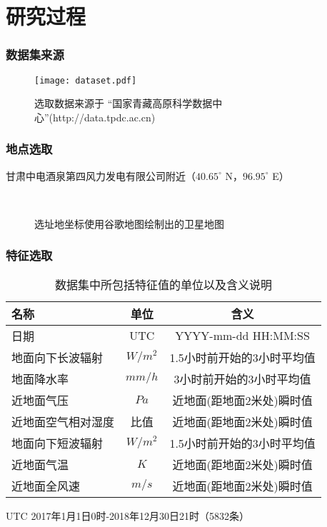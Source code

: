 \documentclass[14pt, AutoFakeBold]{ppt}
\begin{document}
\section{研究过程}

\begin{frame}
  \frametitle{数据集来源}
  \begin{figure}[H]
    \centering
    \texttt{[image: dataset.pdf]}
    \caption{选取数据来源于
    “国家青藏高原科学数据中心”(http://data.tpdc.ac.cn)}
    \label{fig_dataset}
\end{figure}
\end{frame}

\begin{frame}
  \frametitle{地点选取}
  甘肃中电酒泉第四风力发电有限公司附近（$40.65^{\circ}$ N，$96.95^{\circ}$ E）
  \begin{figure}[H]
    \centering
    \\
    \caption{选址地坐标使用谷歌地图绘制出的卫星地图}
    \label{fig_google_maps}
\end{figure}
\end{frame}

\begin{frame}
  \frametitle{特征选取}
  \begin{table}[H]
    \centering
    \caption{数据集中所包括特征值的单位以及含义说明}
    \begin{tabular}{lcc}
    \toprule
    名称 & 单位 & 含义 \\
    \midrule
    日期 & UTC & YYYY-mm-dd HH:MM:SS \\
    地面向下长波辐射 & $W/m^2$ & 1.5小时前开始的3小时平均值 \\
    地面降水率 & $mm/h$ & 3小时前开始的3小时平均值 \\
    近地面气压 & $Pa$ & 近地面(距地面2米处)瞬时值 \\
    近地面空气相对湿度 & 比值 & 近地面(距地面2米处)瞬时值 \\
    地面向下短波辐射 & $W/m^2$ & 1.5小时前开始的3小时平均值 \\
    近地面气温 & $K$ & 近地面(距地面2米处)瞬时值 \\
    近地面全风速 & $m/s$ & 近地面(距地面2米处)瞬时值 \\
    \bottomrule
    \end{tabular}
    \label{features}
\end{table}
UTC 2017年1月1日0时-2018年12月30日21时（5832条）
\end{frame}
\end{document}
